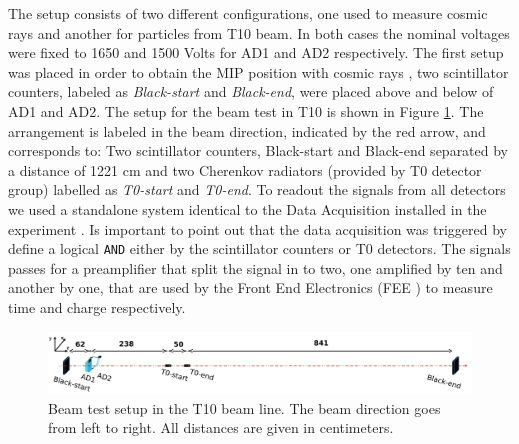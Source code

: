 The setup consists of two different configurations, one used to measure cosmic 
rays and another for particles from T10 beam. In both cases the nominal 
voltages were fixed to 1650 and 1500 Volts for AD1 and AD2 respectively.
The first setup was placed in order to obtain the MIP position with cosmic rays
\cite{cosmicsAD}, two scintillator counters, labeled as \textit{Black-start}  
and \textit{Black-end}, were placed above and below of AD1 and AD2. The setup 
for the beam test in T10 is shown in Figure \ref{figure:BeamSetup}. %
The arrangement is labeled in the beam direction, indicated by the red arrow, 
and corresponds to: Two scintillator counters, Black-start and Black-end 
separated by a distance of 1221 cm and two Cherenkov radiators (provided by T0 
detector group) labelled as \textit{T0-start} and \textit{T0-end}.
%
To readout the signals from all detectors we used a standalone system identical to the Data Acquisition installed in the experiment \cite{ADNote}. 
%
%
Is important to point out that the data acquisition was triggered by define a logical \texttt{AND} either by the scintillator counters or T0 detectors. The signals passes for a preamplifier that split the signal in to two, one amplified by ten and another by one, that are used by the Front End Electronics (FEE \cite{Zoccarato}) to measure time and charge respectively.
%
\begin{figure}[ht!]
	\begin{center}
		\includegraphics[scale=0.44]{images/BeamTest-Setup_v4.pdf}
		\caption{
		Beam test setup in the T10 beam line. The beam direction goes from 
		left to right. All distances are given in centimeters.
		}
		\label{figure:BeamSetup}
	\end{center}
\end{figure}
%